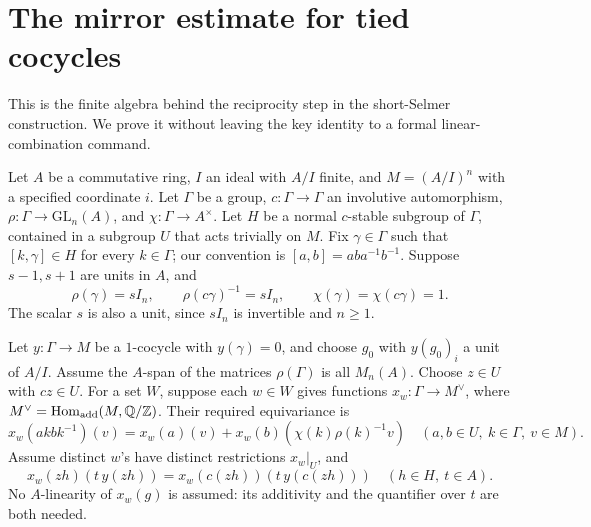 \documentclass[11pt,a4paper]{article}
\theoremstyle{definition}
\newcommand{\Q}{\mathbb Q}
\newcommand{\Z}{\mathbb Z}
\begin{document}
\section{The mirror estimate for tied cocycles}\label{sec:mirror}
This is the finite algebra behind the reciprocity step in the short-Selmer
construction. We prove it without leaving the key identity to a formal
linear-combination command.

Let \(A\) be a commutative ring, \(I\) an ideal with \(A/I\) finite, and
\(M=(A/I)^n\) with a specified coordinate \(i\).
Let \(\Gamma\) be a group, \(c:\Gamma\to\Gamma\) an involutive automorphism,
\(\rho:\Gamma\to\mathrm{GL}_n(A)\), and
\(\chi:\Gamma\to A^\times\).
Let \(H\) be a normal \(c\)-stable subgroup of \(\Gamma\), contained in
a subgroup \(U\) that acts trivially on \(M\).
Fix \(\gamma\in\Gamma\) such that \([k,\gamma]\in H\) for every \(k\in\Gamma\);
our convention is \([a,b]=aba^{-1}b^{-1}\).
Suppose \(s-1,s+1\) are units in \(A\), and
\[
 \rho(\gamma)=sI_n,\qquad \rho(c\gamma)^{-1}=sI_n,\qquad
 \chi(\gamma)=\chi(c\gamma)=1.
\]
The scalar \(s\) is also a unit, since \(sI_n\) is invertible and \(n\ge1\).

Let \(y:\Gamma\to M\) be a \(1\)-cocycle with \(y(\gamma)=0\), and choose
\(g_0\) with \(y(g_0)_i\) a unit of \(A/I\).
Assume the \(A\)-span of the matrices \(\rho(\Gamma)\) is all \(M_n(A)\).
Choose \(z\in U\) with \(cz\in U\).
For a set \(W\), suppose each \(w\in W\) gives functions
\(x_w:\Gamma\to M^\vee\), where
\(M^\vee=\operatorname{Hom}_{\rm add}(M,\Q/\Z)\).
Their required equivariance is
\begin{equation}\label{eq:mirror-equivariance}
 x_w(a k b k^{-1})(v)
   =x_w(a)(v)+x_w(b)(\chi(k)\rho(k)^{-1}v)
 \quad(a,b\in U,\ k\in\Gamma,\ v\in M).
\end{equation}
Assume distinct \(w\)'s have distinct restrictions \(x_w|_U\), and
\begin{equation}\label{eq:mirror-isotropic}
 x_w(zh)(t\,y(zh))
       =x_w(c(zh))(t\,y(c(zh)))
 \quad(h\in H,\ t\in A).
\end{equation}
No \(A\)-linearity of \(x_w(g)\) is assumed: its additivity and the
quantifier over \(t\) are both needed.
\end{document}

